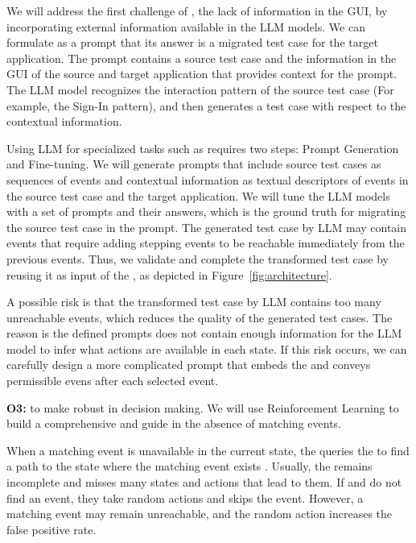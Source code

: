 \smallskip
We will  address the first challenge of \testreuse, the lack of information in the GUI, by incorporating external information available in the LLM models.
We can formulate \testreuse as a prompt that its answer is a migrated test case for the target application.
The prompt contains a source test case and the information in the GUI of the source and target application that provides context for the prompt. 
The LLM model recognizes the interaction pattern of the source test case (For example, the Sign-In pattern), and then generates a test case with respect to the contextual information.


\smallskip
Using LLM for specialized tasks such as \testreuse requires two steps: Prompt Generation and Fine-tuning. 
We will generate prompts that include source test cases as sequences of events and contextual information as textual descriptors of events in the source test case and the target application.
We will tune the LLM models with a set of prompts and their answers, which is the ground truth for migrating the source test case in the prompt.
The generated test case by LLM may contain events that require adding stepping events to be reachable immediately from the previous events.
 Thus, we validate and complete the transformed test case by reusing it as input of the \selector, as depicted in Figure~\ref{fig:architecture}. 



\smallskip
A possible risk is that the transformed test case by LLM contains too many unreachable events, which reduces the quality of the generated test cases.
The reason is the defined prompts does not contain enough information  for the LLM model to infer what actions are available in each state.
If this risk occurs, we can carefully design a more complicated prompt that embeds the \tam and conveys permissible evens after each selected event.




\bigskip 
\noindent
\textbf{O3:} to make \testreuse robust in decision making. We will use Reinforcement Learning to build a comprehensive \tam and guide \testreuse in the absence of matching events. 

\smallskip
When a matching event is unavailable in the current state, the \selector queries the \tam to find a path to the state where the matching event exists	.
Usually, the \tam remains incomplete and misses many states and actions that lead to them.
If \atm and \adaptdroid do not find an event, they take random actions and \craftdroid skips the event.  However, a matching event may remain unreachable, and the random action increases the false positive rate. 


